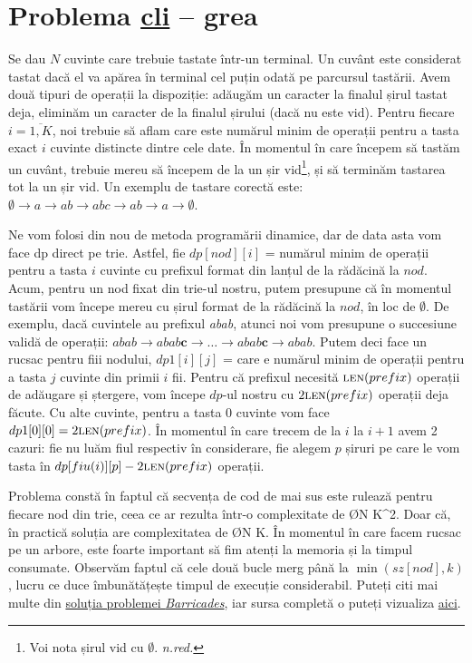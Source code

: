 \section{Problema \href{https://kilonova.ro/problems/274}{cli} -- grea}
Se dau $N$ cuvinte care trebuie tastate într-un terminal. Un cuvânt este considerat tastat dacă el va apărea în terminal cel puțin odată pe parcursul tastării. Avem două tipuri de operații la dispoziție: adăugăm un caracter la finalul șirul tastat deja, eliminăm un caracter de la finalul șirului (dacă nu este vid). Pentru fiecare $i = \overline{1, K}$, noi trebuie să aflam care este numărul minim de operații pentru a tasta exact $i$ cuvinte distincte dintre cele date. În momentul în care începem să tastăm un cuvânt, trebuie mereu să începem de la un șir vid\footnote{Voi nota șirul vid cu $\emptyset$. \textit{n.red.}}, și să terminăm tastarea tot la un șir vid. Un exemplu de tastare corectă este: $\emptyset \rightarrow a \rightarrow ab \rightarrow abc \rightarrow ab \rightarrow a \rightarrow \emptyset$.

Ne vom folosi din nou de metoda programării dinamice, dar de data asta vom face dp direct pe trie. Astfel, fie $dp[nod][i]$ = numărul minim de operații pentru a tasta $i$ cuvinte cu prefixul format din lanțul de la rădăcină la $nod$. Acum, pentru un nod fixat din trie-ul nostru, putem presupune că în momentul tastării vom începe mereu cu șirul format de la rădăcină la $nod$, în loc de $\emptyset$. De exemplu, dacă cuvintele au prefixul \textit{abab}, atunci noi vom presupune o succesiune validă de operații: $abab \rightarrow abab\textbf{c} \rightarrow \dots \rightarrow abab\textbf{c} \rightarrow abab$. Putem deci face un rucsac pentru fiii nodului, $dp1[i][j]$ = care e numărul minim de operații pentru a tasta $j$ cuvinte din primii $i$ fii. Pentru că prefixul necesită $\textsc{len}(prefix)$ operații de adăugare și ștergere, vom începe $dp$-ul nostru cu $2 \textsc{len}(prefix)$ operații deja făcute. Cu alte cuvinte, pentru a tasta $0$ cuvinte vom face $dp1[0][0] = 2 \textsc{len}(prefix)$.
În momentul în care trecem de la $i$ la $i+1$ avem 2 cazuri: fie nu luăm fiul respectiv în considerare, fie alegem $p$ șiruri pe care le vom tasta în $dp[fiu(i)][p] - 2 \textsc{len}(prefix)$ operații. 

Problema constă în faptul că secvența de cod de mai sus este rulează pentru fiecare nod din trie, ceea ce ar rezulta într-o complexitate de \O{N \cdot K^2}. Doar că, în practică soluția are complexitatea de \O{N \cdot K}. În momentul în care facem rucsac pe un arbore, este foarte important să fim atenți la memoria și la timpul consumate. Observăm faptul că cele două bucle merg până la $\min(sz[nod], k)$, lucru ce duce îmbunătățește timpul de execuție considerabil. Puteți citi mai multe din \href{http://www.lookingforachallengethebook.com/uploads/1/4/5/5/14555448/preview-_looking_for_a_challenge.pdf}{soluția problemei \textit{Barricades}}, iar sursa completă o puteți vizualiza \href{https://kilonova.ro/submissions/140069}{aici}.
